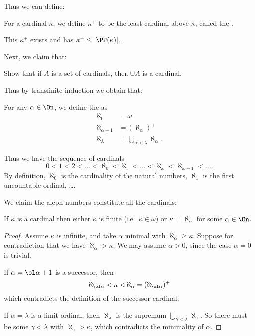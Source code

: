 Thus we can define:
\begin{definition}
	For a cardinal $\kappa$, we define $\kappa^+$ to be the least cardinal above $\kappa$,
	called the .
\end{definition}
This $\kappa^+$ exists and has $\kappa^+ \le \left\lvert \PP(\kappa) \right\rvert$.

Next, we claim that:
\begin{exercise}
	Show that if $A$ is a set of cardinals, then $\cup A$ is a cardinal.
\end{exercise}

Thus by transfinite induction we obtain that:
\begin{definition}
	For any $\alpha \in \On$, we define the  as
	\begin{align*}
		\aleph_0 &= \omega \\
		\aleph_{\alpha+1} &= \left( \aleph_\alpha \right)^+ \\
		\aleph_{\lambda} &= \bigcup_{\alpha < \lambda} \aleph_\alpha.
	\end{align*}
\end{definition}

Thus we have the sequence of cardinals
\[
	0 < 1 < 2 < \dots < \aleph_0 < \aleph_1 < \dots < \aleph_\omega < \aleph_{\omega+1} < \dots.
\]
By definition, $\aleph_0$ is the cardinality of the natural numbers,
$\aleph_1$ is the first uncountable ordinal, \dots.

We claim the aleph numbers constitute all the cardinals:
\begin{lemma}
	If $\kappa$ is a cardinal then
	either $\kappa$ is finite (i.e.\ $\kappa \in \omega$) or
	$\kappa = \aleph_\alpha$ for some $\alpha \in \On$.
\end{lemma}
\begin{proof}
	Assume $\kappa$ is infinite, and take $\alpha$ minimal with $\aleph_\alpha \ge \kappa$.
	Suppose for contradiction that we have $\aleph_\alpha > \kappa$.
	We may assume $\alpha > 0$, since the case $\alpha = 0$ is trivial.

	If $\alpha = \ol\alpha + 1$ is a successor, then
	\[ \aleph_{\ol\alpha} < \kappa < \aleph_{\alpha}
		= (\aleph_{\ol\alpha})^+ \]
	which contradicts the definition of the successor cardinal.

	If $\alpha = \lambda$ is a limit ordinal, then $\aleph_\lambda$ is the
	supremum $\bigcup_{\gamma < \lambda} \aleph_\gamma$.
	So there must be some $\gamma < \lambda$ with $\aleph_\gamma > \kappa$,
	which contradicts the minimality of $\alpha$.
\end{proof}

